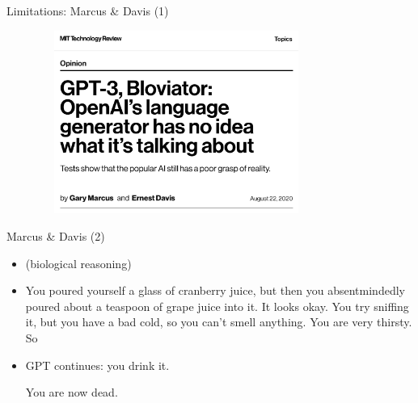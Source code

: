 
\begin{frame}{Limitations: Marcus \& Davis (1)}

\vfill

	\begin{figure}
		\centering
		\includegraphics[height=6cm,width=9cm]{figure/marcusmittechreview.png}
	\end{figure}

\vfill

\end{frame}


\begin{frame}{Marcus \& Davis (2)}

\vfill

  \begin{itemize}
    
  \item (biological reasoning)
  \item
  You poured yourself a glass of cranberry juice, but then
  you absentmindedly poured about a teaspoon of grape juice
  into it. It looks okay. You try sniffing it, but you have
  a bad cold, so you can’t smell anything. You are very
  thirsty. So 
  \item
  GPT continues: you drink it.

  You are now dead.

\end{itemize}

\vfill

\end{frame}


